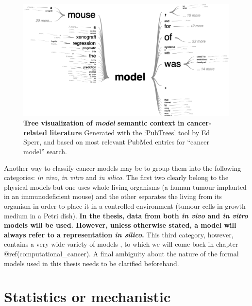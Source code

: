 \documentclass[a4paper,12pt,twoside,onecolumn,openright,final,oldfontcommands]{memoir}
\begin{document}
\begin{figure}

{\centering \includegraphics[width=0.9\linewidth]{fig/pubmed-tree} 

}

\caption[Tree visualization of *model* semantic context in cancer-related literature]{\textbf{Tree visualization of \emph{model}
semantic context in cancer-related literature} Generated with the
\href{https://esperr.github.io/pub-trees/}{`PubTrees'} tool by Ed Sperr,
and based on most relevant PubMed entries for ``cancer model'' search.}\label{fig:pubmed-tree}
\end{figure}






Another way to classify cancer models may be to group them into the
following categories: \emph{in vivo}, \emph{in vitro} and \emph{in
silico}. The first two clearly belong to the physical models but one
uses whole living organisms (a human tumour implanted in an
immunodeficient mouse) and the other separates the living from its
organism in order to place it in a controlled environment (tumour cells
in growth medium in a Petri dish). \textbf{In the thesis, data from both
\emph{in vivo} and \emph{in vitro} models will be used. However, unless
otherwise stated, a model will always refer to a representation \emph{in
silico}.} This third category, however, contains a very wide variety of
models \citep{deisboeck2009silico}, to which we will come back in
chapter @ref(computational\_cancer). A final ambiguity about the nature
of the formal models used in this thesis needs to be clarified
beforehand.

\section{Statistics or mechanistic}\label{stat-mech}
\end{document}
